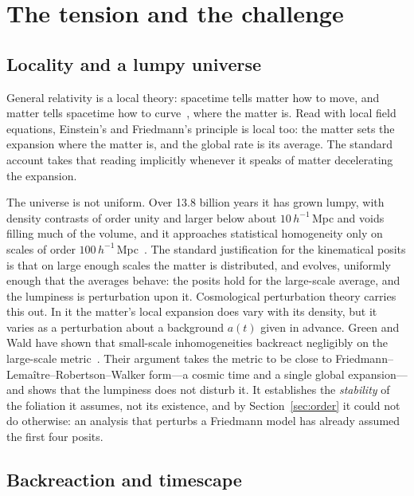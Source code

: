 \documentclass[twocolumn]{aastex701}
\begin{document}
\section{The tension and the challenge}\label{sec:challenge}

\subsection{Locality and a lumpy universe}\label{sec:tension}

General relativity is a local theory: spacetime tells matter how to move, and matter tells spacetime how to curve~\citep{Wheeler1998}, where the matter is. Read with local field equations, Einstein's and Friedmann's principle is local too: the matter sets the expansion where the matter is, and the global rate is its average. The standard account takes that reading implicitly whenever it speaks of matter decelerating the expansion.

The universe is not uniform. Over 13.8 billion years it has grown lumpy, with density contrasts of order unity and larger below about $10\,h^{-1}$\,Mpc and voids filling much of the volume, and it approaches statistical homogeneity only on scales of order $100\,h^{-1}$\,Mpc~\citep{Scrimgeour2012}. The standard justification for the kinematical posits is that on large enough scales the matter is distributed, and evolves, uniformly enough that the averages behave: the posits hold for the large-scale average, and the lumpiness is perturbation upon it. Cosmological perturbation theory carries this out. In it the matter's local expansion does vary with its density, but it varies as a perturbation about a background $a(t)$ given in advance. Green and Wald have shown that small-scale inhomogeneities backreact negligibly on the large-scale metric~\citep{GreenWald2011, GreenWald2014}. Their argument takes the metric to be close to Friedmann--Lema\^itre--Robertson--Walker form---a cosmic time and a single global expansion---and shows that the lumpiness does not disturb it. It establishes the \emph{stability} of the foliation it assumes, not its existence, and by Section~\ref{sec:order} it could not do otherwise: an analysis that perturbs a Friedmann model has already assumed the first four posits.

\subsection{Backreaction and timescape}\label{sec:backreaction}
\end{document}
